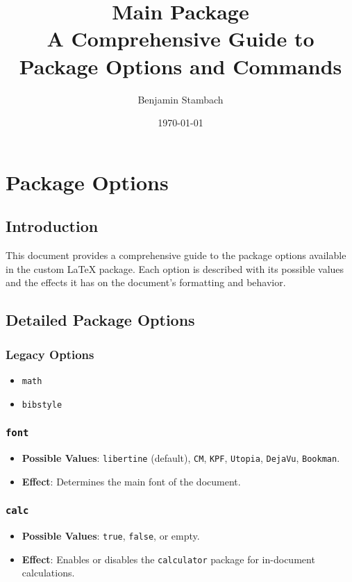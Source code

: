\documentclass[12pt,twoside]{report}
\title{Main Package \\ A Comprehensive Guide to Package Options and Commands}
\author{Benjamin Stambach}
\date{\today}
\begin{document}
\maketitle

\tableofcontents
\startbody
\chapter{Package Options}
\section*{Introduction}
This document provides a comprehensive guide to the package options available in the custom LaTeX package. Each option is described with its possible values and the effects it has on the document's formatting and behavior.

\section{Detailed Package Options}

\subsection{Legacy Options}
\begin{itemize}
    \item \texttt{math} 
    \item \texttt{bibstyle}
\end{itemize}

\subsection{\texttt{font}}
\begin{itemize}
    \item \textbf{Possible Values}: \texttt{libertine} (default), \texttt{CM}, \texttt{KPF}, \texttt{Utopia}, \texttt{DejaVu}, \texttt{Bookman}.
    \item \textbf{Effect}: Determines the main font of the document.
\end{itemize}

\subsection{\texttt{calc}}
\begin{itemize}
    \item \textbf{Possible Values}: \texttt{true}, \texttt{false}, or empty.
    \item \textbf{Effect}: Enables or disables the \texttt{calculator} package for in-document calculations.
\end{itemize}
\end{document}
